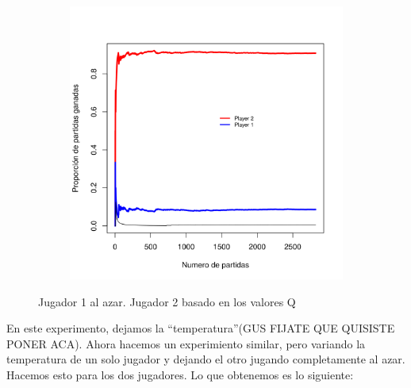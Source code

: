 \documentclass[11pt, spanish]{article}
\begin{document}
\begin{figure}[H]
    \centering
    \begin{subfigure}[b]{0.45\textwidth}
      \includegraphics[width=\textwidth]{Imagenes/SinVision_luchaNoLibre_QsinVison_reverse}
    \end{subfigure}
    \caption{Jugador 1 al azar. Jugador 2 basado en los valores Q}
\end{figure}

\par En este experimento, dejamos la ``temperatura''(GUS FIJATE QUE QUISISTE PONER ACA). 
Ahora hacemos un experimiento similar, pero variando la temperatura de un solo jugador y dejando el otro jugando completamente al azar. Hacemos esto para los dos jugadores. Lo que obtenemos es lo siguiente: 
\end{document}
